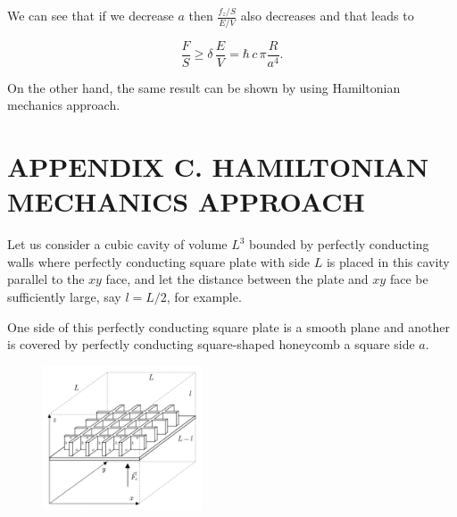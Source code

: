 \documentclass[twoside, 10pt, ptm]{article}
\begin{document}
\begin{multicols}{2}
We can see that if we decrease \(a\) then \(\frac{f_z/S}{E/V}\) also decreases
and that leads to

\begin{equation}\frac{F}{S} \geq \delta\,\frac{E}{V} = \hbar\,c\, \pi\frac{R}{a^4}.\end{equation}

On the other hand, the same result can be shown by using
Hamiltonian mechanics approach.


    \section*{\centering\uppercase{Appendix C. Hamiltonian mechanics
approach}}\label{appendix-c.-hamiltonian-mechanics-approach}
\vspace{-3.5mm}


\setcounter{equation}{0}
\renewcommand{\theequation}{C.\arabic{equation}}

    Let us consider a cubic cavity of volume \(L^3\) bounded by perfectly
conducting walls where perfectly conducting square plate with side
\(L\) is placed in this cavity parallel to the \(xy\) face, and let the distance
between the plate and \(xy\) face be sufficiently large, say \(l = L/2\), for example.

One side of this perfectly conducting square plate is a smooth plane and
another is covered by perfectly conducting square-shaped honeycomb a square side \(a\).

\begin{figure}
\begin{center}
\includegraphics[width=0.42\textwidth]{honeycomb_box_H.png}
\caption{}{}
\end{center}
\label{fig:honeycomb_box_H}
\end{figure}


\end{multicols}
\end{document}
